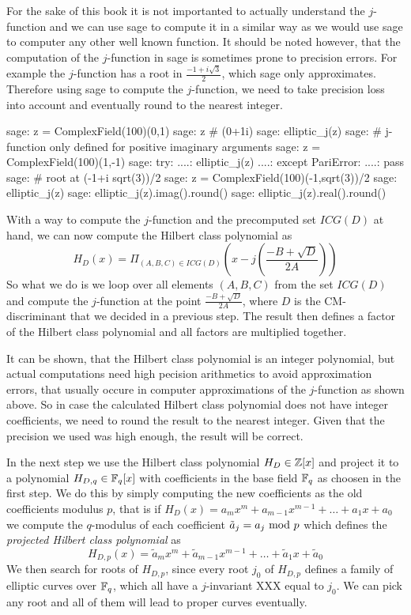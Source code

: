 For the sake of this book it is not importanted to actually understand the $j$-function and we can use sage to compute it in a similar way as we would use sage to computer any other well known function. It should be noted however, that the computation of the $j$-function in sage is sometimes prone to precision errors. For example the $j$-function has a root in $\frac{-1+i\sqrt{3}}{2}$, which sage only approximates. Therefore using sage to compute the $j$-function, we need to take precision loss into account and eventually round to the nearest integer.
\begin{sagecommandline}
sage: z = ComplexField(100)(0,1)
sage: z # (0+1i)
sage: elliptic_j(z)
sage: # j-function only defined for positive imaginary arguments
sage: z = ComplexField(100)(1,-1)
sage: try:
....:     elliptic_j(z)
....: except PariError:
....:     pass
sage: # root at (-1+i sqrt(3))/2
sage: z = ComplexField(100)(-1,sqrt(3))/2
sage: elliptic_j(z)
sage: elliptic_j(z).imag().round()
sage: elliptic_j(z).real().round()
\end{sagecommandline}
With a way to compute the $j$-function and the precomputed set $ICG(D)$ at hand, we can now compute the Hilbert class polynomial as
\begin{equation}
H_D(x) = \Pi_{(A,B,C)\in ICG(D)} \left(x - j\left(\frac{-B + \sqrt{D}}{2A}\right)\right)
\end{equation}
So what we do is we loop over all elements $(A,B,C)$ from the set $ICG(D)$ and compute the $j$-function at the point $\frac{-B + \sqrt{D}}{2A}$, where $D$ is the CM-discriminant that we decided in a previous step. The result then defines a factor of the Hilbert class polynomial and all factors are multiplied together.

It can be shown, that the Hilbert class polynomial is an integer polynomial, but actual computations need high pecision arithmetics to avoid approximation errors, that usually occure in computer approximations of the $j$-function as shown above. So in case the calculated Hilbert class polynomial does not have integer coefficients, we need to round the result to the nearest integer. Given that the precision we used was high enough, the result will be correct.

In the next step we use the Hilbert class polynomial $H_D\in \mathbb{Z}[x]$ and project it to a polynomial $H_{D,q}\in\mathbb{F}_q[x]$ with coefficients in the base field $\mathbb{F}_q$ as choosen in the first step. We do this by simply computing the new coefficients as the old coefficients modulus $p$, that is if $H_D(x)= a_mx^m +a_{m-1}x^{m-1}+\ldots + a_1 x + a_0$ we compute the $q$-modulus of each coefficient
$\tilde{a}_j = a_j \text{ mod } p$ which defines the \textit{projected Hilbert class polynomial} as 
$$
H_{D,p}(x)=\tilde{a}_mx^m +\tilde{a}_{m-1}x^{m-1}+\ldots + \tilde{a}_1 x + \tilde{a}_0
$$
We then search for roots of $H_{D,p}$, since every root $j_0$ of $H_{D,p}$ defines a family of elliptic curves over $\mathbb{F}_q$, which all have a $j$-invariant XXX equal to $j_0$. We can pick any root and all of them will lead to proper curves eventually.


